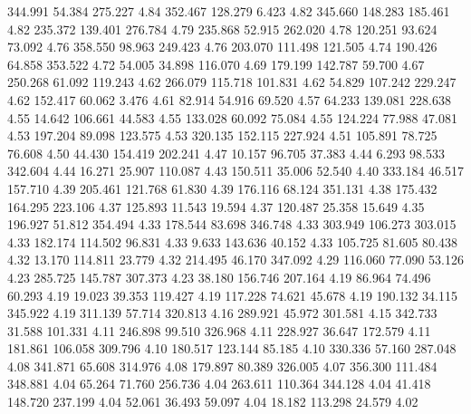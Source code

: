  344.991   54.384  275.227         4.84
 352.467  128.279    6.423         4.82
 345.660  148.283  185.461         4.82
 235.372  139.401  276.784         4.79
 235.868   52.915  262.020         4.78
 120.251   93.624   73.092         4.76
 358.550   98.963  249.423         4.76
 203.070  111.498  121.505         4.74
 190.426   64.858  353.522         4.72
  54.005   34.898  116.070         4.69
 179.199  142.787   59.700         4.67
 250.268   61.092  119.243         4.62
 266.079  115.718  101.831         4.62
  54.829  107.242  229.247         4.62
 152.417   60.062    3.476         4.61
  82.914   54.916   69.520         4.57
  64.233  139.081  228.638         4.55
  14.642  106.661   44.583         4.55
 133.028   60.092   75.084         4.55
 124.224   77.988   47.081         4.53
 197.204   89.098  123.575         4.53
 320.135  152.115  227.924         4.51
 105.891   78.725   76.608         4.50
  44.430  154.419  202.241         4.47
  10.157   96.705   37.383         4.44
   6.293   98.533  342.604         4.44
  16.271   25.907  110.087         4.43
 150.511   35.006   52.540         4.40
 333.184   46.517  157.710         4.39
 205.461  121.768   61.830         4.39
 176.116   68.124  351.131         4.38
 175.432  164.295  223.106         4.37
 125.893   11.543   19.594         4.37
 120.487   25.358   15.649         4.35
 196.927   51.812  354.494         4.33
 178.544   83.698  346.748         4.33
 303.949  106.273  303.015         4.33
 182.174  114.502   96.831         4.33
   9.633  143.636   40.152         4.33
 105.725   81.605   80.438         4.32
  13.170  114.811   23.779         4.32
 214.495   46.170  347.092         4.29
 116.060   77.090   53.126         4.23
 285.725  145.787  307.373         4.23
  38.180  156.746  207.164         4.19
  86.964   74.496   60.293         4.19
  19.023   39.353  119.427         4.19
 117.228   74.621   45.678         4.19
 190.132   34.115  345.922         4.19
 311.139   57.714  320.813         4.16
 289.921   45.972  301.581         4.15
 342.733   31.588  101.331         4.11
 246.898   99.510  326.968         4.11
 228.927   36.647  172.579         4.11
 181.861  106.058  309.796         4.10
 180.517  123.144   85.185         4.10
 330.336   57.160  287.048         4.08
 341.871   65.608  314.976         4.08
 179.897   80.389  326.005         4.07
 356.300  111.484  348.881         4.04
  65.264   71.760  256.736         4.04
 263.611  110.364  344.128         4.04
  41.418  148.720  237.199         4.04
  52.061   36.493   59.097         4.04
  18.182  113.298   24.579         4.02
